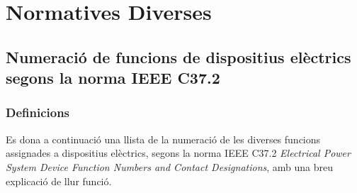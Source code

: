 \chapter{Normatives Diverses}\label{sec:ch-normes}

\section{Numeració de funcions de dispositius elèctrics segons la norma IEEE C37.2 }\label{sec:ieee-c37-2}

\subsection{Definicions}

Es dona a continuació una llista de la numeració de les diverses funcions assignades a dispositius
elèctrics, segons la norma IEEE C37.2 \textit{Electrical Power System Device Function Numbers and Contact Designations}, amb una breu
explicació de llur funció.

